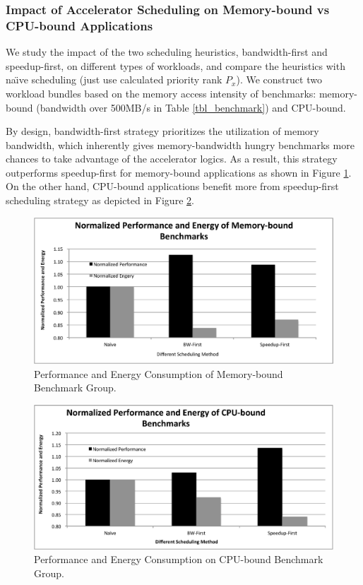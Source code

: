 \subsubsection{Impact of Accelerator Scheduling on Memory-bound vs
  CPU-bound Applications}

We study the impact of the two scheduling heuristics, bandwidth-first
and speedup-first, on different types of workloads, and compare the
heuristics with na\"{\i}ve scheduling (just use calculated priority
rank $P_x$).  We construct two workload bundles based on the memory
access intensity of benchmarks: memory-bound (bandwidth over 500MB/s
in Table \ref{tbl_benchmark}) and CPU-bound.

By design,
bandwidth-first strategy prioritizes the utilization of memory
bandwidth, which inherently gives memory-bandwidth hungry benchmarks
more chances to take advantage of the accelerator logics. As a result,
this strategy outperforms speedup-first for memory-bound
applications as shown in Figure \ref{fig_mem_bound}. On the other hand,
CPU-bound applications benefit more from speedup-first
scheduling strategy as depicted in Figure \ref{fig_cpu_bound}.

\begin{figure}
    \centering
    \includegraphics[width=4.5in]{Memory-Bounded}
    \caption{Performance and Energy Consumption of Memory-bound Benchmark Group.}
    \label{fig_mem_bound}
\end{figure}

\begin{figure}
    \centering
    \includegraphics[width=4.5in]{CPU-Bounded}
    \caption{Performance and Energy Consumption on CPU-bound Benchmark Group.}
    \label{fig_cpu_bound}
\end{figure}



